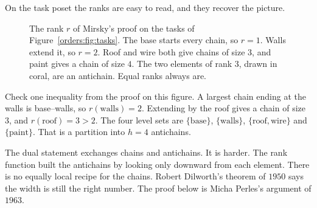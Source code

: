 On the task poset the ranks are easy to read, and they recover the picture.

\begin{figure}[ht]
\centering
{}
\caption{The rank $r$ of Mirsky's proof on the tasks of Figure~\ref{orders:fig:tasks}. The base starts every chain, so $r=1$. Walls extend it, so $r=2$. Roof and wire both give chains of size $3$, and paint gives a chain of size $4$. The two elements of rank $3$, drawn in coral, are an antichain. Equal ranks always are.}
\label{orders:fig:ranks}
\end{figure}

Check one inequality from the proof on this figure. A largest chain ending at the walls is base--walls, so $r(\text{walls})=2$. Extending by the roof gives a chain of size $3$, and $r(\text{roof})=3>2$. The four level sets are $\{\text{base}\}$, $\{\text{walls}\}$, $\{\text{roof},\text{wire}\}$ and $\{\text{paint}\}$. That is a partition into $h=4$ antichains.

The dual statement exchanges chains and antichains. It is harder. The rank function built the antichains by looking only downward from each element. There is no equally local recipe for the chains. Robert Dilworth's theorem of $1950$ says the width is still the right number. The proof below is Micha Perles's argument of $1963$.

